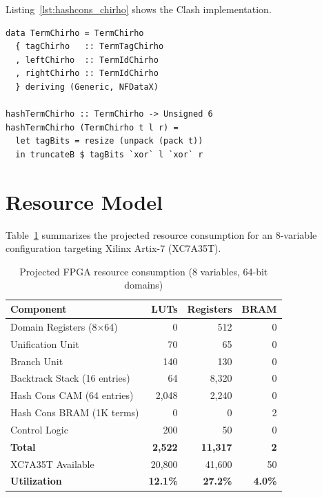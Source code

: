 \documentclass[11pt,a4paper]{article}
\begin{document}
Listing~\ref{lst:hashcons_chirho} shows the Clash implementation.

\begin{lstlisting}[style=calyxstyle_chirho, caption={Hash consing types in Clash (excerpt from \texttt{clash\_chirho/HashConsChirho.hs})}, label={lst:hashcons_chirho}]
data TermChirho = TermChirho
  { tagChirho   :: TermTagChirho
  , leftChirho  :: TermIdChirho
  , rightChirho :: TermIdChirho
  } deriving (Generic, NFDataX)

hashTermChirho :: TermChirho -> Unsigned 6
hashTermChirho (TermChirho t l r) =
  let tagBits = resize (unpack (pack t))
  in truncateB $ tagBits `xor` l `xor` r
\end{lstlisting}

\section{Resource Model}
\label{sec:resource_chirho}

Table~\ref{tab:resources_chirho} summarizes the projected resource consumption
for an 8-variable configuration targeting Xilinx Artix-7 (XC7A35T).

\begin{table}[ht]
\centering
\caption{Projected FPGA resource consumption (8 variables, 64-bit domains)}
\label{tab:resources_chirho}
\begin{tabular}{lrrr}
\toprule
\textbf{Component} & \textbf{LUTs} & \textbf{Registers} & \textbf{BRAM} \\
\midrule
Domain Registers (8$\times$64) & 0 & 512 & 0 \\
Unification Unit & 70 & 65 & 0 \\
Branch Unit & 140 & 130 & 0 \\
Backtrack Stack (16 entries) & 64 & 8,320 & 0 \\
Hash Cons CAM (64 entries) & 2,048 & 2,240 & 0 \\
Hash Cons BRAM (1K terms) & 0 & 0 & 2 \\
Control Logic & 200 & 50 & 0 \\
\midrule
\textbf{Total} & \textbf{2,522} & \textbf{11,317} & \textbf{2} \\
\midrule
XC7A35T Available & 20,800 & 41,600 & 50 \\
\textbf{Utilization} & \textbf{12.1\%} & \textbf{27.2\%} & \textbf{4.0\%} \\
\bottomrule
\end{tabular}
\end{table}
\end{document}

